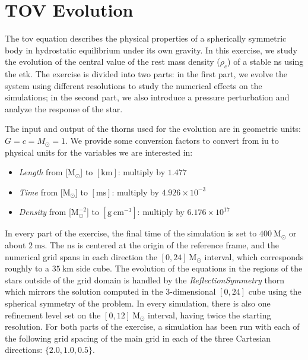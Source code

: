 \documentclass[11pt, a4paper]{article}
\begin{document}
\newpage

\section{TOV Evolution}

The \acrfull{tov} equation describes the physical properties of a spherically symmetric body in hydrostatic equilibrium under its own gravity. In this exercise, we study the evolution of the central value of the rest mass density (\(\rho_c\)) of a stable \acrfull{ns} using the \acrshort{etk}. The exercise is divided into two parts: in the first part, we evolve the system using different resolutions to study the numerical effects on the simulations; in the second part, we also introduce a pressure perturbation and analyze the response of the star.

The input and output of the thorns used for the evolution are in geometric units: \(G = c = M_\odot = 1\). We provide some conversion factors to convert from \acrfull{iu} to physical units for the variables we are interested in:

\begin{itemize}
    \item \textit{Length} from [\(\mathrm{M_\odot}\)] to \([\mathrm{km}]\): multiply by \(1.477\)
    \item \textit{Time} from [\(\mathrm{M_\odot}\)] to \([\mathrm{ms}]\): multiply by \(4.926 \times 10^{-3}\)
    \item \textit{Density} from [\(\mathrm{M_\odot^{-2}}\)] to \([\mathrm{g\ cm^{-3}}]\): multiply by \(6.176 \times 10^{17}\)
\end{itemize}

\noindent
In every part of the exercise, the final time of the simulation is set to \(400\ \mathrm{M_\odot}\) or about \(2\ \mathrm{ms}\). The \acrshort{ns} is centered at the origin of the reference frame, and the numerical grid spans in each direction the \([0, 24]\ \mathrm{M_\odot}\) interval, which corresponds roughly to a \(35\ \mathrm{km}\) side cube. The evolution of the equations in the regions of the stars outside of the grid domain is handled by the \textit{ReflectionSymmetry} thorn which mirrors the solution computed in the 3-dimensional \([0, 24]\) cube using the spherical symmetry of the problem. In every simulation, there is also one refinement level set on the \([0, 12]\ \mathrm{M_\odot}\) interval, having twice the starting resolution. For both parts of the exercise, a simulation has been run with each of the following grid spacing of the main grid in each of the three Cartesian directions: \(\{2.0, 1.0, 0.5\}\).
\end{document}

